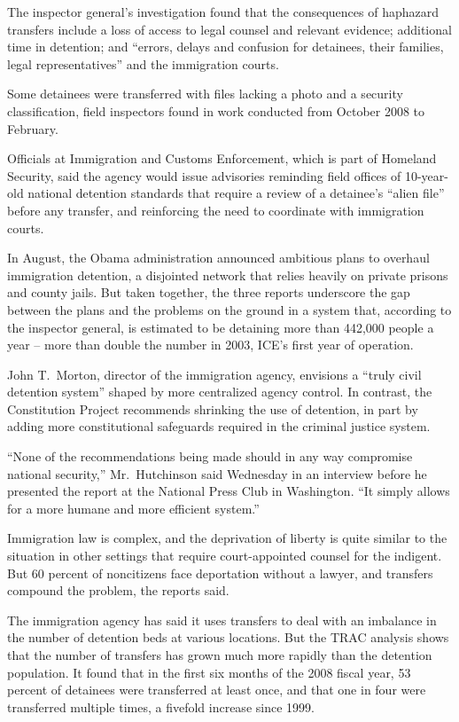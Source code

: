 ﻿\documentclass[12pt]{article}
\begin{document}
The inspector general's investigation found that the consequences of haphazard transfers include a
loss of access to legal counsel and relevant evidence; additional time in detention; and ``errors,
delays and confusion for detainees, their families, legal representatives'' and the immigration
courts.

Some detainees were transferred with files lacking a photo and a security classification, field
inspectors found in work conducted from October 2008 to February.

Officials at Immigration and Customs Enforcement, which is part of Homeland Security, said the
agency would issue advisories reminding field offices of 10-year-old national detention standards
that require a review of a detainee's ``alien file'' before any transfer, and reinforcing the need
to coordinate with immigration courts.

In August, the Obama administration announced ambitious plans to overhaul immigration detention, a
disjointed network that relies heavily on private prisons and county jails. But taken together, the
three reports underscore the gap between the plans and the problems on the ground in a system that,
according to the inspector general, is estimated to be detaining more than 442,000 people a year --
more than double the number in 2003, ICE's first year of operation.

John T.~Morton, director of the immigration agency, envisions a ``truly civil detention system''
shaped by more centralized agency control. In contrast, the Constitution Project recommends
shrinking the use of detention, in part by adding more constitutional safeguards required in the
criminal justice system.

``None of the recommendations being made should in any way compromise national security,''
Mr.~Hutchinson said Wednesday in an interview before he presented the report at the National Press
Club in Washington. ``It simply allows for a more humane and more efficient system.''

Immigration law is complex, and the deprivation of liberty is quite similar to the situation in
other settings that require court-appointed counsel for the indigent. But 60 percent of noncitizens
face deportation without a lawyer, and transfers compound the problem, the reports said.

The immigration agency has said it uses transfers to deal with an imbalance in the number of
detention beds at various locations. But the TRAC analysis shows that the number of transfers has
grown much more rapidly than the detention population. It found that in the first six months of the
2008 fiscal year, 53 percent of detainees were transferred at least once, and that one in four were
transferred multiple times, a fivefold increase since 1999.
\end{document}
